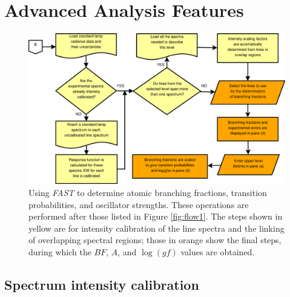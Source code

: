 \documentclass[a4paper,12pt]{report}
\begin{document}
\chapter{Advanced Analysis Features}

\begin{figure}\centering
\includegraphics[scale=0.30]{Fast_Flow2.eps}
\caption{Using \emph{FAST} to determine atomic branching fractions, transition probabilities, and oscillator strengths. These operations are performed after those listed in Figure \ref{fig:flow1}. The steps shown in yellow are for intensity calibration of the line spectra and the linking of overlapping spectral regions; those in orange show the final steps, during which the $BF$, $A$, and $\log(gf)$ values are obtained.}
\label{fig:flow2}
\end{figure}

\section{Spectrum intensity calibration}
\label{section:intcal}
\end{document}
